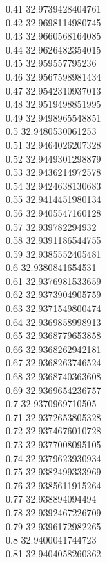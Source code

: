 {0.41	32.9739428404761\\
0.42	32.9698114980745\\
0.43	32.9660568164085\\
0.44	32.9626482354015\\
0.45	32.959557795236\\
0.46	32.9567598981434\\
0.47	32.9542310937013\\
0.48	32.9519498851995\\
0.49	32.9498965548851\\
0.5	32.9480530061253\\
0.51	32.9464026207328\\
0.52	32.9449301298879\\
0.53	32.9436214972578\\
0.54	32.9424638130683\\
0.55	32.9414451980134\\
0.56	32.9405547160128\\
0.57	32.939782294932\\
0.58	32.9391186544755\\
0.59	32.9385552405481\\
0.6	32.9380841654531\\
0.61	32.9376981533659\\
0.62	32.9373904905759\\
0.63	32.9371549800474\\
0.64	32.9369858998913\\
0.65	32.9368779653858\\
0.66	32.9368262942181\\
0.67	32.9368263746524\\
0.68	32.9368740363608\\
0.69	32.9369654236757\\
0.7	32.9370969710505\\
0.71	32.9372653805328\\
0.72	32.9374676010728\\
0.73	32.9377008095105\\
0.74	32.9379623930934\\
0.75	32.9382499333969\\
0.76	32.9385611915264\\
0.77	32.938894094494\\
0.78	32.9392467226709\\
0.79	32.9396172982265\\
0.8	32.9400041744723\\
0.81	32.9404058260362\\
}
